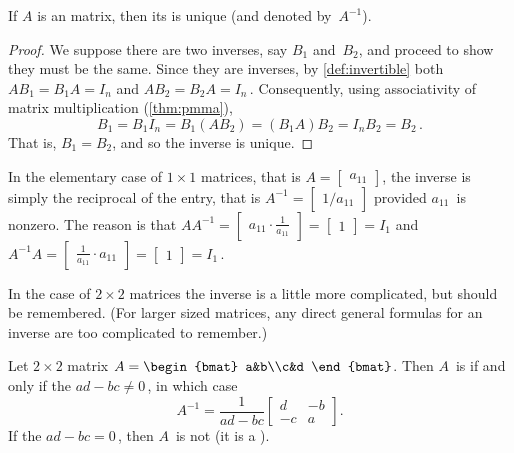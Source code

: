 \begin{theorem} \label{thm:uninv} 
If \(A\) is an  matrix, then its  is unique (and denoted by~\(A^{-1}\)).
\end{theorem}
\begin{proof} 
We suppose there are two inverses, say \(B_1\) and~\(B_2\), and proceed to show they must be the same.
Since they are inverses, by \cref{def:invertible} both
\(AB_1=B_1A=I_n\) and \(AB_2=B_2A=I_n\)\,.
Consequently, using associativity of matrix multiplication (\cref{thm:pmma}),
\begin{equation*}
B_1=B_1I_n=B_1(AB_2)=(B_1A)B_2=I_nB_2=B_2\,.
\end{equation*}
That is, \(B_1=B_2\), and so the inverse is unique.
\end{proof}



In the elementary case of \(1\times1\) matrices, that is \(A=\begin{bmatrix} a_{11} \end{bmatrix}\), the inverse is simply the reciprocal of the entry, that is \(A^{-1}=\begin{bmatrix} 1/a_{11} \end{bmatrix}\) provided \(a_{11}\)~is nonzero.
The reason is that \(AA^{-1}=\begin{bmatrix} a_{11}\cdot\frac1{a_{11}} \end{bmatrix}=\begin{bmatrix} 1 \end{bmatrix}=I_1\) and  \(A^{-1}A=\begin{bmatrix} \frac1{a_{11}}\cdot a_{11} \end{bmatrix}=\begin{bmatrix} 1 \end{bmatrix}=I_1\)\,.

In the case of \(2\times2\) matrices the inverse is a little more complicated, but should be remembered.
(For larger sized matrices, any direct general formulas for an inverse are too complicated to remember.)

\begin{theorem} \label{thm:2x2det} 
Let \(2\times2\) matrix \(A=\begin{bmat} a&b\\c&d \end{bmat}\). Then \(A\)~is  if and only if the  \(ad-bc\neq0\)\,, in which case
\begin{equation}
A^{-1}=\frac1{ad-bc}\begin{bmatrix} d&-b\\-c&a \end{bmatrix}.
\label{eq:2x2inv}
\end{equation}
If the  \(ad-bc=0\)\,, then \(A\)~is not  (it is a ).
\end{theorem}

